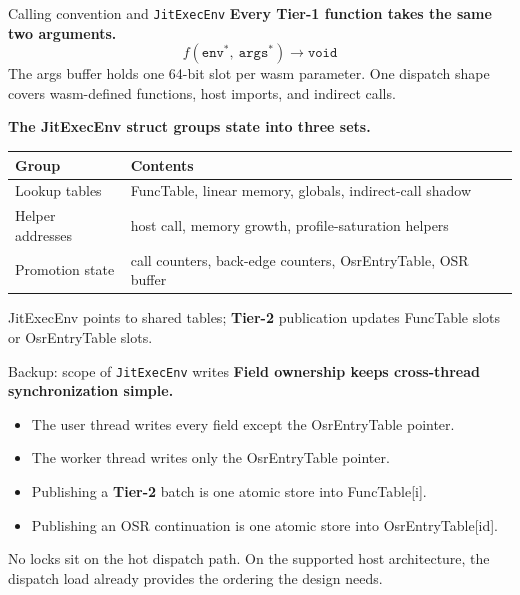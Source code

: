 \documentclass[aspectratio=169,11pt]{beamer}
\newcommand{\tone}{\textbf{\textcolor{tier1}{Tier-1}}}
\newcommand{\ttwo}{\textbf{\textcolor{tier2}{Tier-2}}}
\newcommand{\code}[1]{{\ttfamily\small #1}}
\begin{document}
\appendix
\begin{frame}{Calling convention and \texttt{JitExecEnv}}
  \small
  \textbf{Every \tone{} function takes the same two arguments.}
  \[
    f(\texttt{env}^{*},~\texttt{args}^{*}) \to \texttt{void}
  \]
  The args buffer holds one 64-bit slot per wasm parameter.
  One dispatch shape covers wasm-defined functions, host imports, and indirect calls.

  \vspace{0.4em}
  \textbf{The \code{JitExecEnv} struct groups state into three sets.}
  \begin{center}
  \scriptsize
  \begin{tabular}{ll}
    \toprule
    Group & Contents \\
    \midrule
    Lookup tables    & \code{FuncTable}, linear memory, globals, indirect-call shadow \\
    Helper addresses & host call, memory growth, profile-saturation helpers \\
    Promotion state  & call counters, back-edge counters, \code{OsrEntryTable}, OSR buffer \\
    \bottomrule
  \end{tabular}
  \end{center}
  \vspace{0.2em}
  \scriptsize \code{JitExecEnv} points to shared tables; \ttwo{} publication updates \code{FuncTable} slots or \code{OsrEntryTable} slots.
\end{frame}

\begin{frame}{Backup: scope of \texttt{JitExecEnv} writes}
  \textbf{Field ownership keeps cross-thread synchronization simple.}
  \begin{itemize}\setlength{\itemsep}{2pt}
    \item The user thread writes every field except the \code{OsrEntryTable} pointer.
    \item The worker thread writes only the \code{OsrEntryTable} pointer.
    \item Publishing a \ttwo{} batch is one atomic store into \code{FuncTable[i]}.
    \item Publishing an OSR continuation is one atomic store into \code{OsrEntryTable[id]}.
  \end{itemize}
  \vspace{0.5em}
  No locks sit on the hot dispatch path.
  On the supported host architecture, the dispatch load already provides the ordering the design needs.
\end{frame}
\end{document}
